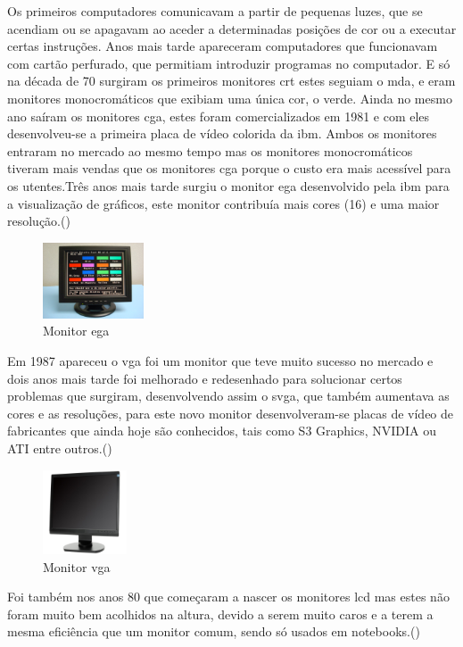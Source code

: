 \documentclass[a4paper]{report}
\begin{document}
Os primeiros computadores comunicavam a partir de pequenas luzes, que se acendiam ou se apagavam ao aceder a determinadas posições de cor ou a executar certas instruções. Anos mais tarde apareceram computadores que funcionavam com cartão perfurado, que permitiam introduzir programas no computador. E só na década de 70 surgiram os primeiros monitores \ac{crt} estes seguiam o \ac{mda}, e eram monitores monocromáticos que exibiam uma única cor, o verde. Ainda no mesmo ano saíram os monitores \ac{cga}, estes foram comercializados em 1981 e com eles desenvolveu-se a primeira placa de vídeo colorida da \ac{ibm}. Ambos os monitores entraram no mercado ao mesmo tempo mas os monitores monocromáticos tiveram mais vendas que os monitores \ac{cga} porque o custo era mais acessível para os utentes.Três anos mais tarde surgiu o monitor \ac{ega} desenvolvido pela \ac{ibm} para a visualização de gráficos, este monitor contribuía mais cores (16) e uma maior resolução.(\cite{mc})\\
\begin{center}
\begin{figure}[H]
\center
\includegraphics[width=3cm]{imagens/cga.JPG}
\caption{Monitor \ac{ega}}
\end{figure}
\end{center}
Em 1987 apareceu o \ac{vga} foi um monitor que teve muito sucesso no mercado e dois anos mais tarde foi melhorado e redesenhado para solucionar certos problemas que surgiram, desenvolvendo assim o \ac{svga}, que também aumentava as cores e as resoluções, para este novo monitor  desenvolveram-se placas de vídeo de fabricantes que ainda hoje são conhecidos, tais como S3 Graphics, NVIDIA ou ATI entre outros.(\cite{mc})
\begin{center}
\begin{figure}[h]
\center
\includegraphics[width=2.5cm]{imagens/vga.jpg}
\caption{Monitor \ac{vga}}
\end{figure}
\end{center}
Foi também nos anos 80 que começaram a nascer os monitores \ac{lcd} mas estes não foram muito bem acolhidos na altura, devido a serem muito caros e a terem a mesma eficiência que um monitor comum, sendo só usados em notebooks.(\cite{mc})
\end{document}
